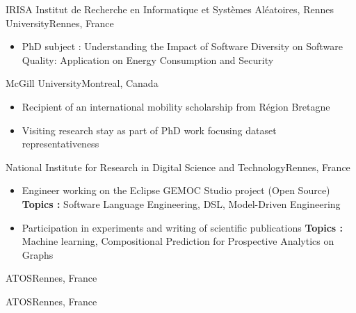 
{IRISA Institut de Recherche en Informatique et Systèmes Aléatoires, Rennes University}{Rennes, France}
{
\begin{itemize}
    \item PhD subject : Understanding the Impact of Software Diversity on Software Quality: Application on Energy Consumption and Security
\end{itemize}
}

{McGill University}{Montreal, Canada}
{
\begin{itemize}
    \item Recipient of an international mobility scholarship from Région Bretagne
    \item Visiting research stay as part of PhD work focusing dataset representativeness
\end{itemize}
}

{National Institute for Research in Digital Science and Technology}{Rennes, France}
{
\begin{itemize}
\item Engineer working on the Eclipse GEMOC Studio project (Open Source) 
\newline \textbf{Topics :} Software Language Engineering, DSL, Model-Driven Engineering
\item Participation in experiments and writing of scientific publications
\newline\textbf{Topics :} Machine learning, Compositional Prediction for Prospective Analytics on Graphs
\end{itemize}
}

{ATOS}{Rennes, France}{}

{ATOS}{Rennes, France}{}
